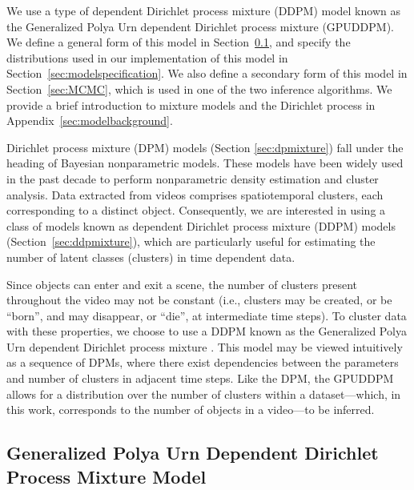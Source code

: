 \documentclass[twocolumn, final]{svjour3}
\begin{document}
We use a type of dependent Dirichlet process mixture (DDPM) model known as the Generalized Polya Urn dependent Dirichlet process mixture (GPUDDPM). We define a general form of this model in Section~\ref{sec:gpuddpm}, and specify the distributions used in our implementation of this model in Section~\ref{sec:modelspecification}. We also define a secondary form of this model in Section~\ref{sec:MCMC}, which is used in one of the two inference algorithms. We provide a brief introduction to mixture models and the Dirichlet process in Appendix~\ref{sec:modelbackground}.

Dirichlet process mixture (DPM) models (Section \ref{sec:dpmixture}) fall under the heading of Bayesian nonparametric models. These models have been widely used in the past decade to perform nonparametric density estimation and cluster analysis. Data extracted from videos comprises spatiotemporal clusters, each corresponding to a distinct object. Consequently, we are interested in using a class of models known as dependent Dirichlet process mixture (DDPM) models (Section~\ref{sec:ddpmixture}), which are particularly useful for estimating the number of latent classes (clusters) in time dependent data. 

Since objects can enter and exit a scene, the number of clusters present throughout the video may not be constant (i.e., clusters may be created, or be ``born'', and may disappear, or ``die'', at intermediate time steps). To cluster data with these properties, we choose to use a DDPM known as the Generalized Polya Urn dependent Dirichlet process mixture \cite{caron_2007}. This model may be viewed intuitively as a sequence of DPMs, where there exist dependencies between the parameters and number of clusters in adjacent time steps. Like the DPM, the GPUDDPM allows for a distribution over the number of clusters within a dataset---which, in this work, corresponds to the number of objects in a video---to be inferred.



\subsection{Generalized Polya Urn Dependent Dirichlet Process Mixture Model}
\label{sec:gpuddpm}
\end{document}
